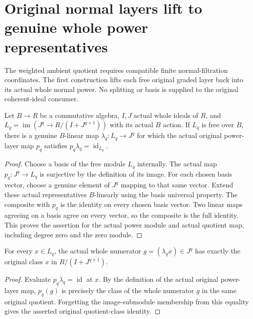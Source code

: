 \section{Original normal layers lift to genuine whole power representatives}

The weighted ambient quotient requires compatible finite normal-filtration
coordinates. The first construction lifts each free original graded layer
back into its actual whole normal power. No splitting or basis is supplied
to the original coherent-ideal consumer.

\begin{lemma}
\label{hir:relative-normal-actual-free-layer-power-lift}
\leanok
Let $B\to R$ be a commutative algebra, $I,J$ actual whole ideals of $R$,
and $L_q=\operatorname{im}(J^q\to R/(I+J^{q+1}))$ with its actual
$B$ action. If $L_q$ is free over $B$, there is a genuine $B$-linear
map $\lambda_q:L_q\to J^q$ for which the actual original power-layer
map $p_q$ satisfies $p_q\lambda_q=\operatorname{id}_{L_q}$.
\end{lemma}
\begin{proof}
Choose a basis of the free module $L_q$ internally. The actual map
$p_q:J^q\to L_q$ is surjective by the definition of its image. For each
chosen basis vector, choose a genuine element of $J^q$ mapping to that
same vector. Extend these actual representatives $B$-linearly using
the basis universal property. The composite with $p_q$ is the identity
on every chosen basis vector. Two linear maps agreeing on a basis
agree on every vector, so the composite is the full identity.
This proves the assertion for the actual power module and actual
quotient map, including degree zero and the zero module.
\end{proof}

\begin{lemma}
\label{hir:relative-normal-actual-free-layer-power-lift-numerators}
\leanok
For every $x\in L_q$, the actual whole numerator
$g=(\lambda_q x)\in J^q$ has exactly the original class $x$ in
$R/(I+J^{q+1})$.
\end{lemma}
\begin{proof}
Evaluate $p_q\lambda_q=\operatorname{id}$ at $x$. By the definition
of the actual original power-layer map, $p_q(g)$ is precisely the
class of the whole numerator $g$ in the same original quotient.
Forgetting the image-submodule membership from this equality gives
the asserted original quotient-class identity.
\end{proof}

